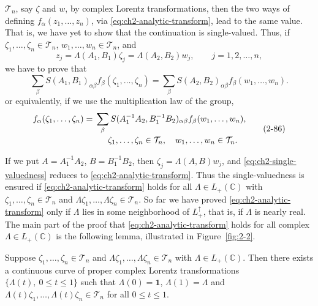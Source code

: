 $\mathcal{T}_{n}$, say $\zeta$ and $w$, by complex Lorentz transformations,
then the two ways of
defining $f_{\alpha}(z_1,\ldots,z_n)$, via \eqref{eq:ch2-analytic-transform}, lead to the same value.
That is, we have yet to show that the continuation is single-valued.  Thus, if
$\zeta_1,\ldots,\zeta_n\in\mathcal{T}_{n}$,
$w_1,\ldots,w_n\in\mathcal{T}_{n}$, and
\begin{equation*}
  z_j=\Lambda(A_1,B_1)\zeta_j
      =\Lambda(A_2,B_2)w_j,\qquad j=1,2,\ldots,n ,
\end{equation*}
we have to prove that
\begin{equation*}
  \sum_{\beta}S(A_1,B_1)_{\alpha\beta}
  f_{\beta}(\zeta_1,\ldots,\zeta_n)
  =\sum_{\beta}S(A_2,B_2)_{\alpha\beta}
  f_{\beta}(w_1,\ldots,w_n) .
\end{equation*}
or equivalently, if we use the multiplication law of the group,
\begin{equation}
  \begin{split}
  f_{\alpha}(\zeta_1,\ldots,\zeta_n)
  ={}&\sum_{\beta}S(A_1^{-1}A_2,B_1^{-1}B_2)_{\alpha\beta}
  f_{\beta}(w_1,\ldots,w_n),\\[-2pt]
  &\hspace{1.5em}\zeta_1,\ldots,\zeta_n\in\mathcal{T}_{n},\quad
  w_1,\ldots,w_n\in\mathcal{T}_{n} .
  \end{split}
  \tag{2-86}\label{eq:ch2-single-valuedness}
\end{equation}

If we put $A=A_1^{-1}A_2$, $B=B_1^{-1}B_2$, then
$\zeta_j=\Lambda(A,B)w_j$, and \eqref{eq:ch2-single-valuedness} reduces to \eqref{eq:ch2-analytic-transform}.  Thus the
single-valuedness is ensured if \eqref{eq:ch2-analytic-transform} holds for all $\Lambda\in L_{+}(\mathbb C)$
with $\zeta_1,\ldots,\zeta_n\in\mathcal{T}_{n}$ and
$\Lambda\zeta_1,\ldots,\Lambda\zeta_n\in\mathcal{T}_{n}$.  So far we have
proved \eqref{eq:ch2-analytic-transform} only if $\Lambda$ lies in some neighborhood of
$L^{\uparrow}_{+}$, that is, if $\Lambda$ is nearly real.  The main part of
the proof that \eqref{eq:ch2-analytic-transform} holds for all complex $\Lambda\in L_{+}(\mathbb C)$ is
the following lemma, illustrated in Figure~\ref{fig:2-2}.

\begin{lemma*}
Suppose $\zeta_1,\ldots,\zeta_n\in\mathcal{T}_{n}$ and
$\Lambda\zeta_1,\ldots,\Lambda\zeta_n\in\mathcal{T}_{n}$ with
$\Lambda\in L_{+}(\mathbb C)$.  Then there exists a continuous curve of
proper complex Lorentz transformations
$\{\Lambda(t),\ 0\leq t\leq1\}$ such that
$\Lambda(0)=\mathbf{1}$, $\Lambda(1)=\Lambda$ and
$\Lambda(t)\zeta_1,\ldots,\Lambda(t)\zeta_n\in\mathcal{T}_{n}$ for all
$0\leq t\leq1$.
\end{lemma*}


